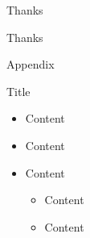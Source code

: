 \begin{frame}{Thanks}
  \begin{center}
  \Huge
  Thanks
  \end{center}
\end{frame}

\begin{frame}{Appendix}
\end{frame}



\begin{frame}{Title}
  \begin{itemize}
    \item Content
    \vspace{\baselineskip}
    \item Content
    \vspace{\baselineskip}
    \item Content
    \begin{itemize}
       \item Content
       \item Content
     \end{itemize}
  \end{itemize}
\end{frame}